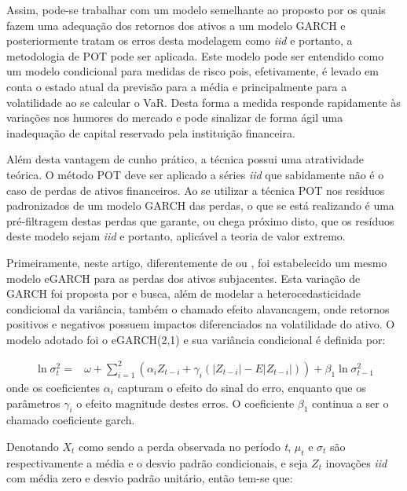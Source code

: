 \documentclass[1p]{elsarticle}
\theoremstyle{definition}
\begin{document}
Assim, pode-se trabalhar com um modelo semelhante ao proposto por \cite{McNeil2000} os quais fazem uma adequação dos retornos dos ativos a um modelo GARCH e posteriormente tratam os erros desta modelagem como \emph{iid} e portanto, a metodologia de POT pode ser aplicada. Este modelo pode ser entendido como um modelo condicional para medidas de risco pois, efetivamente, é levado em conta o estado atual da previsão para a média e principalmente para a volatilidade ao se calcular o VaR. Desta forma a medida responde rapidamente às variações nos humores do mercado e pode sinalizar de forma ágil uma inadequação de capital reservado pela instituição financeira.

Além desta vantagem de cunho prático, a técnica possui uma atratividade teórica. O método POT deve ser aplicado a séries \emph{iid} que sabidamente não é o caso de perdas de ativos financeiros. Ao se utilizar a técnica POT nos resíduos padronizados de um modelo GARCH das perdas, o que se está realizando é uma pré-filtragem destas perdas que garante, ou chega próximo disto, que os resíduos deste modelo sejam \emph{iid} e portanto, aplicável a teoria de valor extremo. 

Primeiramente, neste artigo, diferentemente de \cite{McNeil2000} ou \cite{Karmakar2014}, foi estabelecido um mesmo modelo eGARCH para as perdas dos ativos subjacentes. Esta variação de GARCH foi proposta por \cite{Nelson1991} e busca, além de modelar a heterocedasticidade condicional da variância, também o chamado efeito alavancagem, onde retornos positivos e negativos possuem impactos diferenciados na volatilidade do ativo. O modelo adotado foi o eGARCH(2,1) e sua variância condicional é definida por:

\begin{align}
\label{eq:egarch}
\ln\sigma_t^2=&\omega+ \sum_{i=1}^{2}\left(\alpha_i Z_{t-i}+ \gamma_i(|Z_{t-i}|-E|Z_{t-i}|)\right)+ \beta_1 \ln\sigma_{t-1}^2
\end{align}
onde os coeficientes $\alpha_i$ capturam o efeito do sinal do erro, enquanto que os parâmetros $\gamma_i$ o efeito magnitude destes erros. O coeficiente $\beta_1$ continua a ser o chamado coeficiente garch. %


Denotando $X_t$ como sendo a perda observada no período \emph{t}, $\mu_t$ e $\sigma_t$ são respectivamente a média e o desvio padrão condicionais, e seja $Z_t$ inovações \emph{iid} com média zero e desvio padrão unitário, então tem-se que:
\end{document}
